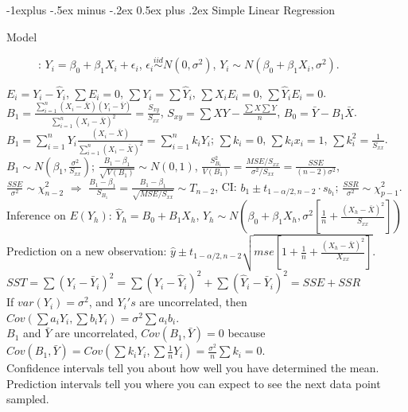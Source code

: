 \documentclass[10pt,landscape]{article}
\makeatletter
\renewcommand{\subsection}{\@startsection{subsection}{2}{0mm}%
                                {-1explus -.5ex minus -.2ex}%
                                {0.5ex plus .2ex}%
                                {\normalfont\normalsize\bfseries}}
\makeatother
\begin{document}
\begin{multicols}{3}
\subsection{Simple Linear Regression}
    \begin{description}
        \item[Model]: $Y_i = \beta_0 + \beta_1X_i + \epsilon_i$, $\epsilon_i \overset{iid}{\sim} N(0, \sigma^2)$, $Y_i\sim	N(\beta_0 + \beta_1X_i, \sigma^2)$. 
    \end{description}
    $E_i = Y_i - \hat{Y}_i$, $\sum E_i = 0$, $\sum Y_i = \sum \hat{Y}_i$, $\sum X_iE_i = 0$, $\sum \hat{Y}_iE_i = 0$. \\
    $B_1 = \frac{\sum_{i=1}^n (X_i-\bar{X})(Y_i-\bar{Y})}{\sum_{i=1}^n (X_i-\bar{X})^2} = \frac{S_{xy}}{S_{xx}}$, $S_{xy} = \sum XY - \frac{\sum X \sum Y}{n}$, $B_0 = \bar{Y} - B_1\bar{X}$. \\
    $B_1 = \sum_{i=1}^n Y_i \frac{(X_i-\bar{X})}{\sum_{i=1}^n (X_i-\bar{X})^2} =\sum_{i=1}^n k_i Y_i $; $\sum	k_i=0$, $\sum k_ix_i=1$, $\sum	 k_i^2 = \frac{1}{S_{xx}}$. \\
    $B_1 \sim	N(\beta_1, \frac{\sigma^2}{S_{xx}})$; $\frac{B_1 - \beta_1}{\sqrt{V(B_1)}}\sim N(0,1)$, $\frac{S_{B_1}^2}{V(B_1)} = \frac{MSE/S_{xx}}{\sigma^2/S_{xx}} = \frac{SSE}{(n-2)\sigma^2}$, \\
    $\frac{SSE}{\sigma^2}\sim	\chi_{n-2}^2$ $\Rightarrow$ $\frac{B_1 - \beta_1}{S_{B_1}} = \frac{B_1 - \beta_1}{\sqrt{MSE/S_{xx}}} \sim T_{n-2}$, CI: $b_1 \pm t_{1-\alpha/2, n-2} \cdot s_{b_1}$; $\frac{SSR}{\sigma^2} \sim	\chi_{p-1}^2$. \\
    Inference on $E(Y_h)$: $\hat{Y}_h = B_0 + B_1X_h $, $\hat{Y}_h \sim N(\beta_0 + \beta_1 X_h, \sigma^2[\frac{1}{n} + \frac{(X_h - \bar{X})^2}{S_{xx}}])$ \\
    Prediction on a new observation: $\hat{y} \pm t_{1-\alpha/2, n-2}\sqrt{mse[1+\frac{1}{n}+\frac{(X_h - \bar{X})^2}{X_{xx}}]}$. \\
    $SST = \sum	(Y_i - \bar{Y}_i)^2 = \sum	(Y_i - \hat{Y}_i)^2 + \sum	(\hat{Y}_i - \bar{Y}_i)^2 = SSE + SSR$\\
    If $var(Y_i) = \sigma^2$, and $Y_i's$ are uncorrelated, then $Cov(\sum	a_iY_i, \sum	b_iY_i) = \sigma^2\sum a_ib_i$. \\
    $B_1$ and $\bar{Y}$ are uncorrelated, $Cov(B_1, \bar{Y}) = 0$ because $Cov(B_1, \bar{Y}) = Cov(\sum k_i Y_i, \sum \frac{1}{n}Y_i) = \frac{\sigma^2}{n} \sum	k_i = 0$. \\
    Confidence intervals tell you about how well you have determined the mean. Prediction intervals tell you where you can expect to see the next data point sampled. \\
    

\end{multicols}
\end{document}
